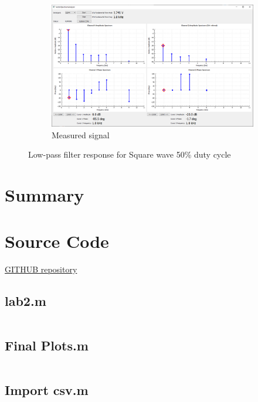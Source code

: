 \documentclass[notitlepage, a4paper, 11pt]{article}
\begin{document}
\begin{figure}[H]
\begin{subfigure}[][][t]{0.45\textwidth}
			\includegraphics[width=\textwidth, trim=10 80 10 100, clip]{../img/Circuit2/trig40}
			\caption{Measured signal}
		\end{subfigure}
		\caption{Low-pass filter response for Square wave 50\% duty cycle}
	\end{figure}
		
	\section{Summary}
	
	\newpage
	\appendix
	\section{Source Code}\label{sec:source-code}
	\href{https://github.com/kamilix2003/CT_labs}{GITHUB repository}
	\subsection*{lab2.m}
	\inputminted{matlab}{../Matlab/lab2.m}
	\subsection*{Final Plots.m}
	\inputminted{matlab}{../Matlab/Final_Plots.m}
	\subsection*{Import csv.m}
	\inputminted{matlab}{../Matlab/RC_circuit.m}
\end{document}
